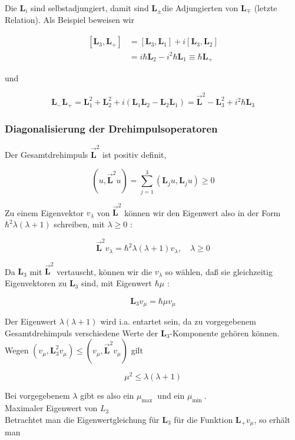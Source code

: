 \documentclass[10pt, letterpaper]{article}
\begin{document}
Die $\mathbf{L}_{i}$ sind selbstadjungiert, damit sind $\mathbf{L}_{ \pm}$die Adjungierten von $\mathbf{L}_{\mp}$ (letzte Relation). Als Beispiel beweisen wir

$$
\begin{aligned}
{\left[\mathbf{L}_{3}, \mathbf{L}_{+}\right] } & =\left[\mathbf{L}_{3}, \mathbf{L}_{1}\right]+i\left[\mathbf{L}_{3}, \mathbf{L}_{2}\right] \\
& =i \hbar \mathbf{L}_{2}-i^{2} \hbar \mathbf{L}_{1} \equiv \hbar \mathbf{L}_{+}
\end{aligned}
$$

und

$$
\mathbf{L}_{-} \mathbf{L}_{+}=\mathbf{L}_{1}^{2}+\mathbf{L}_{2}^{2}+i\left(\mathbf{L}_{1} \mathbf{L}_{2}-\mathbf{L}_{2} \mathbf{L}_{1}\right)=\overrightarrow{\mathbf{L}}^{2}-\mathbf{L}_{3}^{2}+i^{2} \hbar \mathbf{L}_{3}
$$

\subsubsection*{Diagonalisierung der Drehimpulsoperatoren}
Der Gesamtdrehimpuls $\overrightarrow{\mathbf{L}}^{2}$ ist positiv definit,

$$
\left(u, \overrightarrow{\mathbf{L}}^{2} u\right)=\sum_{j=1}^{3}\left(\mathbf{L}_{j} u, \mathbf{L}_{j} u\right) \geq 0
$$

Zu einem Eigenvektor $v_{\lambda}$ von $\overrightarrow{\mathbf{L}}^{2}$ können wir den Eigenwert also in der Form $\hbar^{2} \lambda(\lambda+1)$ schreiben, mit $\lambda \geq 0$ :

$$
\overrightarrow{\mathbf{L}}^{2} v_{\lambda}=\hbar^{2} \lambda(\lambda+1) v_{\lambda}, \quad \lambda \geq 0
$$

Da $\mathbf{L}_{3}$ mit $\overrightarrow{\mathbf{L}}^{2}$ vertauscht, können wir die $v_{\lambda}$ so wählen, daß sie gleichzeitig Eigenvektoren zu $\mathbf{L}_{3}$ sind, mit Eigenwert $\hbar \mu$ :

$$
\mathbf{L}_{3} v_{\mu}=\hbar \mu v_{\mu}
$$

Der Eigenwert $\lambda(\lambda+1)$ wird i.a. entartet sein, da zu vorgegebenem Gesamtdrehimpuls verschiedene Werte der $\mathbf{L}_{3}$-Komponente gehören können.\\
Wegen $\left(v_{\mu}, \mathbf{L}_{3}^{2} v_{\mu}\right) \leq\left(v_{\mu}, \overrightarrow{\mathbf{L}}^{2} v_{\mu}\right)$ gilt

$$
\mu^{2} \leq \lambda(\lambda+1)
$$

Bei vorgegebenem $\lambda$ gibt es also ein $\mu_{\text {max }}$ und ein $\mu_{\text {min }}$.\\
Maximaler Eigenwert von $L_{3}$\\
Betrachtet man die Eigenwertgleichung für $\mathbf{L}_{3}$ für die Funktion $\mathbf{L}_{+} v_{\mu}$, so erhält man
\end{document}

